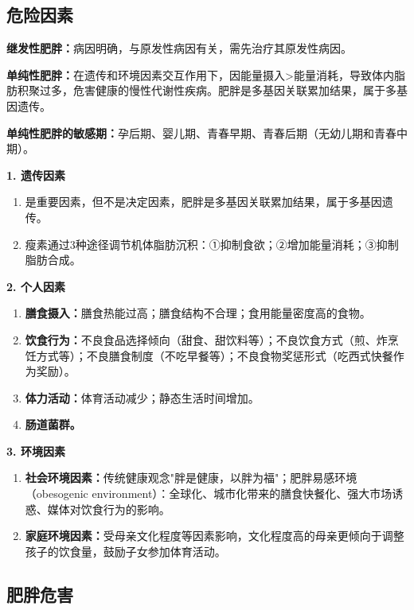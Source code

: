 \subsection{危险因素}

\begin{defbox}
\textbf{继发性肥胖：}病因明确，与原发性病因有关，需先治疗其原发性病因。

\textbf{单纯性肥胖：}在遗传和环境因素交互作用下，因能量摄入>能量消耗，导致体内脂肪积聚过多，危害健康的慢性代谢性疾病。肥胖是多基因关联累加结果，属于多基因遗传。
\end{defbox}

\begin{keybox}
\textbf{单纯性肥胖的敏感期：}孕后期、婴儿期、青春早期、青春后期（无幼儿期和青春中期）。

\textbf{1. 遗传因素}
\begin{enumerate}[leftmargin=*]
    \item 是重要因素，但不是决定因素，肥胖是多基因关联累加结果，属于多基因遗传。
    \item 瘦素通过3种途径调节机体脂肪沉积：①抑制食欲；②增加能量消耗；③抑制脂肪合成。
\end{enumerate}

\textbf{2. 个人因素}
\begin{enumerate}[leftmargin=*]
    \item \textbf{膳食摄入：}膳食热能过高；膳食结构不合理；食用能量密度高的食物。
    \item \textbf{饮食行为：}不良食品选择倾向（甜食、甜饮料等）；不良饮食方式（煎、炸烹饪方式等）；不良膳食制度（不吃早餐等）；不良食物奖惩形式（吃西式快餐作为奖励）。
    \item \textbf{体力活动：}体育活动减少；静态生活时间增加。
    \item \textbf{肠道菌群。}
\end{enumerate}

\textbf{3. 环境因素}
\begin{enumerate}[leftmargin=*]
    \item \textbf{社会环境因素：}传统健康观念"胖是健康，以胖为福"；肥胖易感环境（obesogenic environment）：全球化、城市化带来的膳食快餐化、强大市场诱惑、媒体对饮食行为的影响。
    \item \textbf{家庭环境因素：}受母亲文化程度等因素影响，文化程度高的母亲更倾向于调整孩子的饮食量，鼓励子女参加体育活动。
\end{enumerate}
\end{keybox}

\subsection{肥胖危害}

